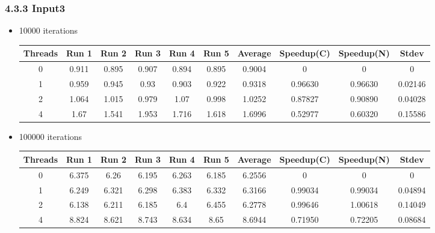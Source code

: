 \subsubsection*{4.3.3 Input3} 
 \begin{itemize}
\item 10000 iterations
\begin{center}
 \begin{adjustbox}{width=\columnwidth, center} 
 \begin{tabular}{ | |c | c c c c c | c | c c | c | |} \hline 
 Threads & Run 1 & Run 2 & Run 3 & Run 4 & Run 5 & Average & Speedup(C) & Speedup(N) & Stdev \\ [0.5ex] 
 \hline 
 \hline 
0& 0.911 & 0.895 & 0.907 & 0.894 & 0.895 & 0.9004 & 0 & 0 & 0\\ 
 \hline
1& 0.959 & 0.945 & 0.93 & 0.903 & 0.922 & 0.9318 & 0.96630 & 0.96630 & 0.02146\\ 
 \hline
2& 1.064 & 1.015 & 0.979 & 1.07 & 0.998 & 1.0252 & 0.87827 & 0.90890 & 0.04028\\ 
 \hline
4& 1.67 & 1.541 & 1.953 & 1.716 & 1.618 & 1.6996 & 0.52977 & 0.60320 & 0.15586\\ 
 \hline
\end{tabular} 
 \end{adjustbox} 
 \end{center} 
\item 100000 iterations
\begin{center}
 \begin{adjustbox}{width=\columnwidth, center} 
 \begin{tabular}{ | |c | c c c c c | c | c c | c | |} \hline 
 Threads & Run 1 & Run 2 & Run 3 & Run 4 & Run 5 & Average & Speedup(C) & Speedup(N) & Stdev \\ [0.5ex] 
 \hline 
 \hline 
0& 6.375 & 6.26 & 6.195 & 6.263 & 6.185 & 6.2556 & 0 & 0 & 0\\ 
 \hline
1& 6.249 & 6.321 & 6.298 & 6.383 & 6.332 & 6.3166 & 0.99034 & 0.99034 & 0.04894\\ 
 \hline
2& 6.138 & 6.211 & 6.185 & 6.4 & 6.455 & 6.2778 & 0.99646 & 1.00618 & 0.14049\\ 
 \hline
4& 8.824 & 8.621 & 8.743 & 8.634 & 8.65 & 8.6944 & 0.71950 & 0.72205 & 0.08684\\ 
 \hline
\end{tabular} 
 \end{adjustbox} 
 \end{center} 
\end{itemize}

